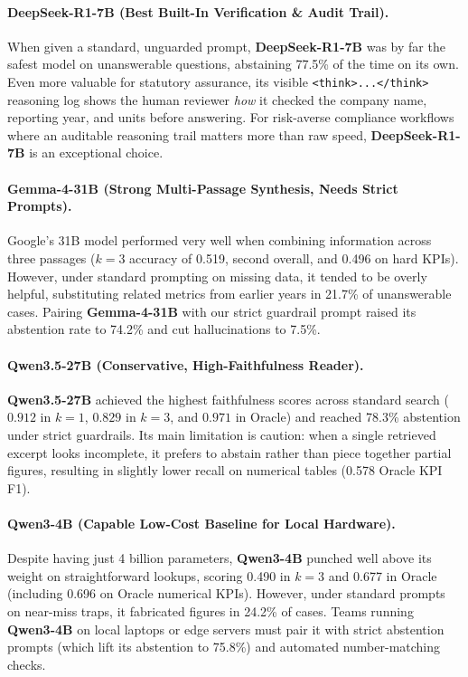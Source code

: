\documentclass[11pt,letterpaper]{article}
\newcommand{\model}[1]{\textbf{#1}}
\begin{document}


\paragraph{\model{DeepSeek-R1-7B} (Best Built-In Verification \& Audit Trail).}
When given a standard, unguarded prompt, \model{DeepSeek-R1-7B} was by far the safest model on unanswerable questions, abstaining 77.5\% of the time on its own. Even more valuable for statutory assurance, its visible \texttt{<think>...</think>} reasoning log shows the human reviewer \textit{how} it checked the company name, reporting year, and units before answering. For risk-averse compliance workflows where an auditable reasoning trail matters more than raw speed, \model{DeepSeek-R1-7B} is an exceptional choice.

\paragraph{\model{Gemma-4-31B} (Strong Multi-Passage Synthesis, Needs Strict Prompts).}
Google's 31B model performed very well when combining information across three passages ($k=3$ accuracy of 0.519, second overall, and 0.496 on hard KPIs). However, under standard prompting on missing data, it tended to be overly helpful, substituting related metrics from earlier years in 21.7\% of unanswerable cases. Pairing \model{Gemma-4-31B} with our strict guardrail prompt raised its abstention rate to 74.2\% and cut hallucinations to 7.5\%.

\paragraph{\model{Qwen3.5-27B} (Conservative, High-Faithfulness Reader).}
\model{Qwen3.5-27B} achieved the highest faithfulness scores across standard search ($0.912$ in $k=1$, $0.829$ in $k=3$, and $0.971$ in Oracle) and reached 78.3\% abstention under strict guardrails. Its main limitation is caution: when a single retrieved excerpt looks incomplete, it prefers to abstain rather than piece together partial figures, resulting in slightly lower recall on numerical tables (0.578 Oracle KPI F1).

\paragraph{\model{Qwen3-4B} (Capable Low-Cost Baseline for Local Hardware).}
Despite having just 4 billion parameters, \model{Qwen3-4B} punched well above its weight on straightforward lookups, scoring 0.490 in $k=3$ and 0.677 in Oracle (including 0.696 on Oracle numerical KPIs). However, under standard prompts on near-miss traps, it fabricated figures in 24.2\% of cases. Teams running \model{Qwen3-4B} on local laptops or edge servers must pair it with strict abstention prompts (which lift its abstention to 75.8\%) and automated number-matching checks.
\end{document}
